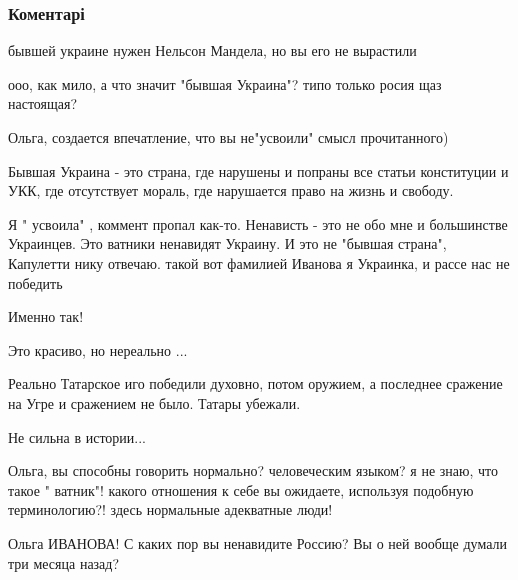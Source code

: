  
 
 
 
 
\subsubsection{Коментарі}
\label{sec:30_08_2014.fb.zharkih_denis.1.chto_delat.cmt}

\begin{itemize} %
бывшей украине нужен Нельсон Мандела, но вы его не вырастили

ооо, как мило, а что значит "бывшая Украина"? типо только росия щаз настоящая?

Ольга, создается впечатление, что вы не"усвоили" смысл прочитанного)


Бывшая Украина - это страна, где нарушены и попраны все статьи конституции и
УКК, где отсутствует мораль, где нарушается право на жизнь и свободу.


Я " усвоила" , коммент пропал как-то. Ненависть - это не обо мне и большинстве
Украинцев. Это ватники ненавидят Украину. И это не "бывшая страна", Капулетти
нику отвечаю. такой вот фамилией Иванова я Украинка, и рассе нас не победить


Именно так!

Это красиво, но нереально ...

Реально Татарское иго победили духовно, потом оружием, а последнее сражение на Угре и сражением не было. Татары убежали.

Не сильна в истории...


Ольга, вы способны говорить нормально? человеческим языком? я не знаю, что
такое " ватник"! какого отношения к себе вы ожидаете, используя подобную
терминологию?! здесь нормальные адекватные люди!

Ольга ИВАНОВА! С каких пор вы ненавидите Россию? Вы о ней вообще думали три месяца назад?


\end{itemize}
